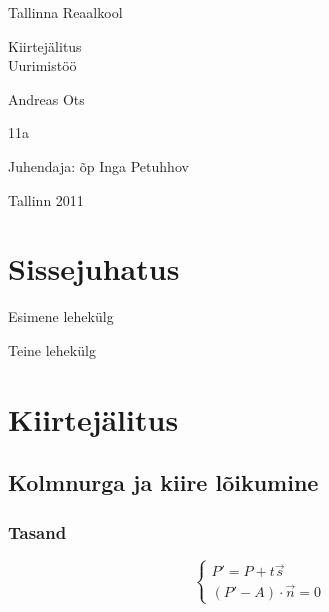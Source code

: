 \documentclass[a4paper,12pt]{report}
\begin{document}
\renewcommand{\BUPhD}{Avaldamata doktoritöö}
\renewcommand{\BAvailFrom}{Loetud:\ }
\begin{center}
Tallinna Reaalkool

\vfill

Kiirtejälitus\\
Uurimistöö

\vfill

\end{center}

\begin{raggedleft}

Andreas Ots

11a

Juhendaja: õp Inga Petuhhov

\end{raggedleft}

\vfill

\begin{center}

Tallinn 2011

\end{center}
\clearpage

\tableofcontents
\listoffigures
\listoftables

\chapter*{Sissejuhatus}
\pagestyle{plain}
\thispagestyle{empty}
Esimene lehekülg

\clearpage

Teine lehekülg

\chapter{Kiirtejälitus}
\section{Kolmnurga ja kiire lõikumine}

\subsection{Tasand}
\[
  \left\{
  \begin{array}{l}
    P' = P + t\vec s \\
    (P' - A)\cdot\vec n = 0
  \end{array}
  \right.
\]
\end{document}
